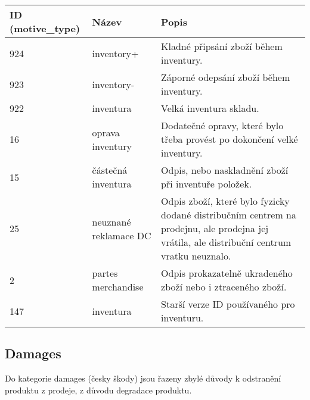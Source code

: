\begin{table}[]
    \begin{tabular}{l l p{7cm}}
    ID (motive\_type) & Název             & Popis \\
    \hline
    924          & inventory+             & Kladné připsání zboží během inventury.      \\
    923          & inventory-             & Záporné odepsání zboží během inventury.      \\
    922          & inventura              & Velká inventura skladu.     \\
    16           & oprava inventury       & Dodatečné opravy, které bylo třeba provést po dokončení velké inventury.      \\
    15           & částečná inventura     & Odpis, nebo naskladnění zboží při inventuře položek.      \\
    25           & neuznané reklamace DC    &  Odpis zboží, které bylo fyzicky dodané distribučním centrem na prodejnu, ale prodejna jej vrátila, ale distribuční centrum vratku neuznalo.     \\
    2            & partes merchandise     & Odpis prokazatelně ukradeného zboží nebo i ztraceného zboží.      \\
    147          & inventura              & Starší verze ID používaného pro inventuru.
    \end{tabular}
\end{table}


\subsection*{Damages}

Do kategorie damages (česky škody) jsou řazeny zbylé důvody k odstranění produktu z prodeje, z důvodu degradace produktu. 

